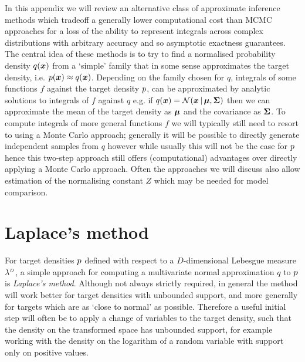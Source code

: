 In this appendix we will review an alternative class of approximate inference methods which tradeoff a generally lower computational cost than \ac{MCMC} approaches for a loss of the ability to represent integrals across complex distributions with arbitrary accuracy and so asymptotic exactness guarantees. The central idea of these methods is to try to find a normalised probability density $q(\boldsymbol{x})$ from a `simple' family that in some sense approximates the target density, i.e. $p(\boldsymbol{x}) \approx q(\boldsymbol{x})$. Depending on the family chosen for $q$, integrals of some functions $f$ against the target density $p$, can be approximated by analytic solutions to integrals of $f$ against $q$ e.g. if $q(\vct{x}) = \nrm{\vct{x} \gvn \vct{\mu},\mtx{\Sigma}}$ then we can approximate the mean of the target density as $\boldsymbol{\mu}$ and the covariance as $\boldsymbol{\Sigma}$. To compute integrals of more general functions $f$ we will typically still need to resort to using a Monte Carlo approach; generally it will be possible to directly generate independent samples from $q$ however while usually this will not be the case for $p$ hence this two-step approach still offers (computational) advantages over directly applying a Monte Carlo approach. Often the approaches we will discuss also allow estimation of the normalising constant $Z$ which may be needed for model comparison.

\section{Laplace's method}

For target densities $p$ defined with respect to a $D$-dimensional Lebesgue measure $\lebm{D}$, a simple approach for computing a multivariate normal approximation  $q$ to $p$ is \emph{Laplace's method}. Although not always strictly required, in general the method will work better for target densities with unbounded support, and more generally for targets which are as `close to normal' as possible. Therefore a useful initial step will often be to apply a change of variables to the target density, such that the density on the transformed space has unbounded support, for example working with the density on the logarithm of a random variable with support only on positive values.


